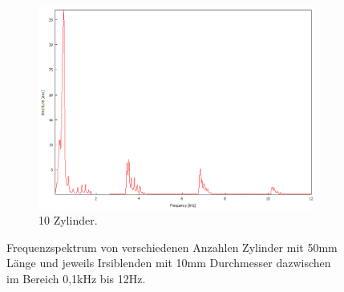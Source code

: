 \begin{figure}
\begin{subfigure}[b]{0.3\textwidth}
        \includegraphics[width=\textwidth]{data/4_2/10mm_10zylinder.png}
        \caption{10 Zylinder.}
    \end{subfigure}
    \hfill
    \caption{Frequenzspektrum von verschiedenen Anzahlen Zylinder mit 50\;mm Länge und jeweils Irsiblenden mit 10\;mm Durchmesser dazwischen im Bereich 0,1\;kHz bis 12\;Hz.}
    \label{fig:allesgleich10}
\end{figure}
